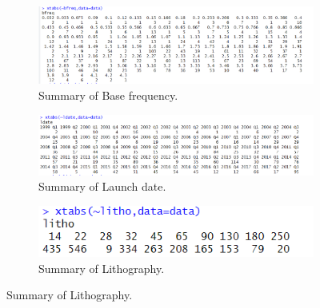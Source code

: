 \begin{figure}[!h]
\centering
    \begin{subfigure}[b]{0.49\textwidth}
        \centering
        \includegraphics[width=\linewidth]{graphics/new_graphics/Xtabs/xtabs-bfreq.png}
        \caption{Summary of Base frequency.}
    \end{subfigure}
    \begin{subfigure}[b]{0.49\textwidth}
        \centering
        \includegraphics[width=\linewidth]{graphics/new_graphics/Xtabs/xtabs-ldate.png}
        \caption{Summary of Launch date.}
    \end{subfigure}
    \hfill
    \begin{subfigure}[b]{0.49\textwidth}
        \centering
        \includegraphics[width=\linewidth]{graphics/new_graphics/Xtabs/xtabs-litho.png}
        \caption{Summary of Lithography.}
    \end{subfigure}


\end{figure}
